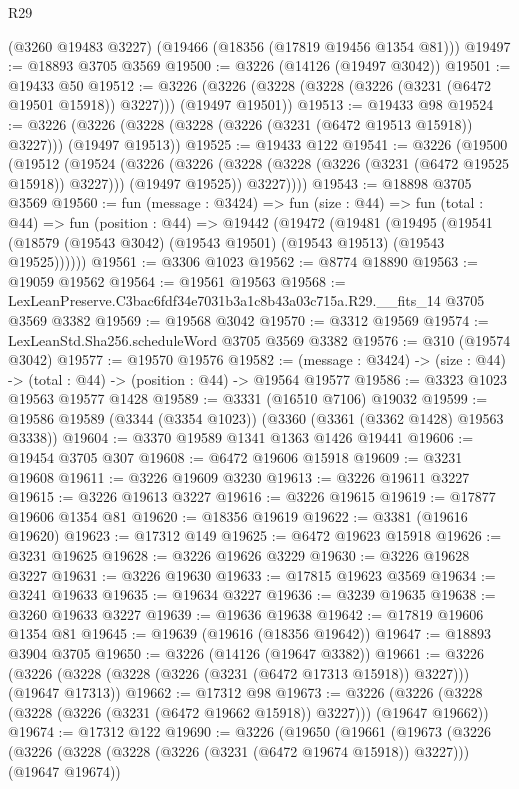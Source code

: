 \begin{lexlean}{R29}
\begin{coremodule}
    (@3260 @19483 @3227)
    (@19466 (@18356 (@17819 @19456 @1354 @81)))
@19497 := @18893 @3705 @3569
@19500 := @3226 (@14126 (@19497 @3042))
@19501 := @19433 @50
@19512 := @3226 (@3226 (@3228 (@3228 (@3226 (@3231 (@6472 @19501 @15918)) @3227))) (@19497 @19501))
@19513 := @19433 @98
@19524 := @3226 (@3226 (@3228 (@3228 (@3226 (@3231 (@6472 @19513 @15918)) @3227))) (@19497 @19513))
@19525 := @19433 @122
@19541 := @3226
    (@19500
      (@19512
        (@19524
          (@3226
            (@3226 (@3228 (@3228 (@3226 (@3231 (@6472 @19525 @15918)) @3227))) (@19497 @19525))
            @3227))))
@19543 := @18898 @3705 @3569
@19560 := fun (message : @3424) =>
  fun (size : @44) =>
  fun (total : @44) =>
  fun (position : @44) =>
  @19442
    (@19472
      (@19481
        (@19495 (@19541 (@18579 (@19543 @3042) (@19543 @19501) (@19543 @19513) (@19543 @19525))))))
@19561 := @3306 @1023
@19562 := @8774 @18890
@19563 := @19059 @19562
@19564 := @19561 @19563
@19568 := LexLeanPreserve.C3bac6fdf34e7031b3a1c8b43a03c715a.R29.__fits_14 @3705 @3569 @3382
@19569 := @19568 @3042
@19570 := @3312 @19569
@19574 := LexLeanStd.Sha256.scheduleWord @3705 @3569 @3382
@19576 := @310 (@19574 @3042)
@19577 := @19570 @19576
@19582 := (message : @3424) -> (size : @44) -> (total : @44) -> (position : @44) -> @19564 @19577
@19586 := @3323 @1023 @19563 @19577 @1428
@19589 := @3331 (@16510 @7106) @19032
@19599 := @19586 @19589 (@3344 (@3354 @1023)) (@3360 (@3361 (@3362 @1428) @19563 @3338))
@19604 := @3370 @19589 @1341 @1363 @1426 @19441
@19606 := @19454 @3705 @307
@19608 := @6472 @19606 @15918
@19609 := @3231 @19608
@19611 := @3226 @19609 @3230
@19613 := @3226 @19611 @3227
@19615 := @3226 @19613 @3227
@19616 := @3226 @19615
@19619 := @17877 @19606 @1354 @81
@19620 := @18356 @19619
@19622 := @3381 (@19616 @19620)
@19623 := @17312 @149
@19625 := @6472 @19623 @15918
@19626 := @3231 @19625
@19628 := @3226 @19626 @3229
@19630 := @3226 @19628 @3227
@19631 := @3226 @19630
@19633 := @17815 @19623 @3569
@19634 := @3241 @19633
@19635 := @19634 @3227
@19636 := @3239 @19635
@19638 := @3260 @19633 @3227
@19639 := @19636 @19638
@19642 := @17819 @19606 @1354 @81
@19645 := @19639 (@19616 (@18356 @19642))
@19647 := @18893 @3904 @3705
@19650 := @3226 (@14126 (@19647 @3382))
@19661 := @3226 (@3226 (@3228 (@3228 (@3226 (@3231 (@6472 @17313 @15918)) @3227))) (@19647 @17313))
@19662 := @17312 @98
@19673 := @3226 (@3226 (@3228 (@3228 (@3226 (@3231 (@6472 @19662 @15918)) @3227))) (@19647 @19662))
@19674 := @17312 @122
@19690 := @3226
    (@19650
      (@19661
        (@19673
          (@3226
            (@3226 (@3228 (@3228 (@3226 (@3231 (@6472 @19674 @15918)) @3227))) (@19647 @19674))

\end{coremodule}
\end{lexlean}
